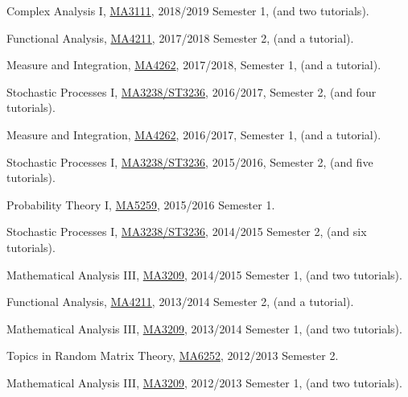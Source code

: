 \documentclass[12pt,a4paper]{article}
\newenvironment{item_list}{
 \begin{list}{}{
   \setlength{\leftmargin}{1.5em}
   \setlength{\itemsep}{0.25em}
   \setlength{\parskip}{0pt}
   \setlength{\parsep}{0.25em}
 }
}{
 \end{list}
}
\begin{document}
\begin{item_list}
\item
  Complex Analysis I, \href{http://www.math.nus.edu.sg/~matwd/teaching/MA3111_F18/index.html}{MA3111}, 2018/2019 Semester 1, (and two tutorials).
\item
  Functional Analysis, \href{http://www.math.nus.edu.sg/~matwd/teaching/MA4211_S18/index.html}{MA4211}, 2017/2018 Semester 2, (and a tutorial).
\item
  Measure and Integration, \href{http://www.math.nus.edu.sg/~matwd/teaching/MA4262_F17/index.html}{MA4262}, 2017/2018, Semester 1, (and a tutorial).
\item
  Stochastic Processes I, \href{http://www.math.nus.edu.sg/~matwd/teaching/MA3238_ST3236_S17/index.html}{MA3238/ST3236}, 2016/2017, Semester 2, (and four tutorials).
\item
  Measure and Integration, \href{http://www.math.nus.edu.sg/~matwd/teaching/MA4262_F16/index.html}{MA4262}, 2016/2017, Semester 1, (and a tutorial).
\item
  Stochastic Processes I, \href{http://www.math.nus.edu.sg/~matwd/teaching/MA3238_ST3236_S16/index.html}{MA3238/ST3236}, 2015/2016, Semester 2, (and five tutorials).
\item
  Probability Theory I, \href{http://www.math.nus.edu.sg/~matwd/teaching/MA5259_F15/index.html}{MA5259}, 2015/2016 Semester 1.
\item
  Stochastic Processes I, \href{http://www.math.nus.edu.sg/~matwd/teaching/MA3238_ST3236_S15/index.html}{MA3238/ST3236}, 2014/2015 Semester 2, (and six tutorials).
\item
  Mathematical Analysis III, \href{http://www.math.nus.edu.sg/~matwd/teaching/MA3209_F14/index.html}{MA3209}, 2014/2015 Semester 1, (and two tutorials).
\item
  Functional Analysis, \href{http://www.math.nus.edu.sg/~matwd/teaching/MA4211_S14/index.html}{MA4211}, 2013/2014 Semester 2, (and a tutorial).
\item
  Mathematical Analysis III, \href{http://www.math.nus.edu.sg/~matwd/teaching/MA3209_F13/index.html}{MA3209}, 2013/2014 Semester 1, (and two tutorials).
\item
  Topics in Random Matrix Theory, \href{http://www.math.nus.edu.sg/~matwd/teaching/MA6252_S13/index.html}{MA6252}, 2012/2013 Semester 2.
\item
  Mathematical Analysis III, \href{http://www.math.nus.edu.sg/~matwd/teaching/MA3209_F12/index.html}{MA3209}, 2012/2013 Semester 1, (and two tutorials).
\end{item_list}
\end{document}
